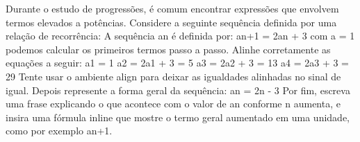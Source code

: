 \documentclass{article}
\begin{document}
Durante o estudo de progressões, é comum encontrar expressões que envolvem termos elevados a potências.
Considere a seguinte sequência definida por uma relação de recorrência:
A sequência an é definida por:
    an+1 = 2an + 3
com a = 1
podemos calcular os primeiros termos passo a passo. Alinhe corretamente as equações a seguir:
    a1 = 1
    a2 = 2a1 + 3 = 5
    a3 = 2a2 + 3 = 13
    a4 = 2a3 + 3 = 29
Tente usar o ambiente align para deixar as igualdades alinhadas no sinal de igual.
Depois represente a forma geral da sequência:
    an = 2n - 3
Por fim, escreva uma frase explicando o que acontece com o valor de 
an conforme  n aumenta, e insira uma fórmula inline que mostre o termo geral aumentado em uma unidade, como por exemplo an+1.    
\end{document}
